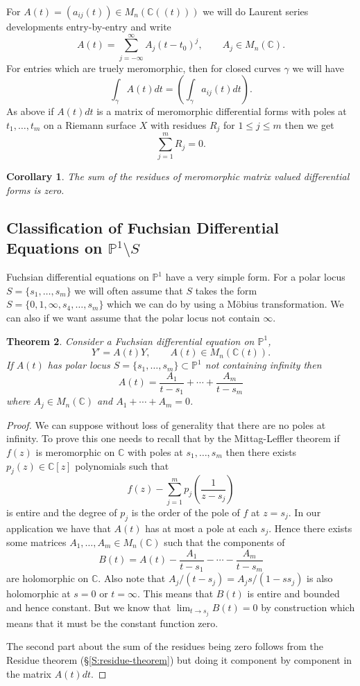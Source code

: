 \documentclass[]{book}
\numberwithin{equation}{section}
\newtheorem{theorem}{Theorem}[subsection]
\newtheorem{corollary}[theorem]{Corollary}
\theoremstyle{definition}
\theoremstyle{remark}
\newcommand{\CC}{\mathbb{C}}
\newcommand{\PP}{\mathbb{P}}
\begin{document}
For $A(t) = (a_{ij}(t)) \in M_n(\CC((t)))$ we will do Laurent series developments entry-by-entry and write 
$$ A(t) = \sum_{j=-\infty}^{\infty} A_j (t-t_0)^j, \qquad A_j \in M_n(\CC).$$
For entries which are truely meromorphic, then for closed curves $\gamma$ we will have  
$$\int_{\gamma} A(t)dt = (\int_{\gamma}a_{ij}(t)dt).$$ 
As above if $A(t)dt$ is a matrix of meromorphic differential forms with poles at $t_1,\ldots,t_m$ on a Riemann surface $X$ with residues $R_j$ for $1\leq j \leq m$ then we get
$$ \sum_{j=1}^m R_j =0.$$

\begin{corollary}
	The sum of the residues of meromorphic matrix valued differential forms is zero.
\end{corollary}

\subsection{Classification of Fuchsian Differential Equations on $\PP^1 \setminus S$}
Fuchsian differential equations on $\PP^1$ have a very simple form.
For a polar locus $S = \lbrace s_1,\ldots,s_m\rbrace$ we will often assume that $S$ takes the form $S =\lbrace 0,1,\infty,s_4,\ldots,s_m \rbrace$ which we can do by using a M\"{o}bius transformation. 
We can also if we want assume that the polar locus not contain $\infty$. 
\begin{theorem}
	Consider a Fuchsian differential equation on $\PP^1$,
	$$ Y' = A(t) Y, \qquad A(t) \in M_n(\CC(t)).$$
	If $A(t)$ has polar locus $S=\lbrace s_1,\ldots,s_m\rbrace \subset \PP^1$ not containing infinity then 
	$$ A(t) = \frac{A_1}{t-s_1} + \cdots + \frac{A_m}{t-s_m} $$
	where $A_j \in M_n(\CC)$ and $A_1+\cdots + A_m=0$.
\end{theorem}
\begin{proof}
	We can suppose without loss of generality that there are no poles at infinity. 
	To prove this one needs to recall that by the Mittag-Leffler theorem \cite[Proposition 2.19]{Schlag2014 } if $f(z)$ is meromorphic on $\CC$ with poles at $s_1,\ldots,s_m$ then there exists $p_j(z) \in \CC[z]$ polynomials such that 
	$$ f(z) - \sum_{j=1}^m p_j( \frac{1}{z-s_j}) $$
	is entire and the degree of $p_j$ is the order of the pole of $f$ at $z=s_j$.
	In our application we have that $A(t)$ has at most a pole at each $s_j$. 
	Hence there exists some matrices $A_1,\ldots, A_m \in M_n(\CC)$ such that the components of  
	$$B(t) = A(t) - \frac{A_1}{t-s_1} - \cdots - \frac{A_m}{t-s_m} $$
	are holomorphic on $\CC$. 
	Also note that $A_j/(t-s_j) = A_js/(1-ss_j)$ is also holomorphic at $s=0$ or $t=\infty$. 
	This means that $B(t)$ is entire and bounded and hence constant. 
	But we know that $\lim_{t\to s_j}B(t) =0$ by construction which means that it must be the constant function zero. 
	
	The second part about the sum of the residues being zero follows from the Residue theorem (\S \ref{S:residue-theorem}) but doing it component by component in the matrix $A(t)dt$.
\end{proof}
\end{document}
